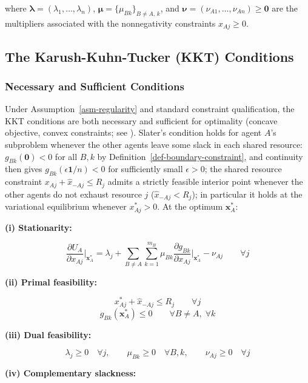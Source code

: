 \documentclass[11pt]{article}
\theoremstyle{plain}
\theoremstyle{definition}
\theoremstyle{remark}
\let\origsubsection\subsection
\renewcommand{\subsection}{\needspace{7\baselineskip}\origsubsection}
\let\origsubsubsection\subsubsection
\renewcommand{\subsubsection}{\needspace{4\baselineskip}\origsubsubsection}
\begin{document}
where \(\boldsymbol{\lambda} = (\lambda_1, \ldots, \lambda_n)\),
\(\boldsymbol{\mu} = \{\mu_{Bk}\}_{B \neq A, \, k}\), and
\(\boldsymbol{\nu} = (\nu_{A1}, \ldots, \nu_{An}) \geq \mathbf{0}\) are
the multipliers associated with the nonnegativity constraints
\(x_{Aj} \geq 0\).

\subsection{The Karush-Kuhn-Tucker (KKT)
Conditions}\label{the-karush-kuhn-tucker-kkt-conditions}

\subsubsection{Necessary and Sufficient
Conditions}\label{necessary-and-sufficient-conditions}

Under Assumption~\ref{asm-regularity} and standard constraint
qualification, the KKT conditions are both necessary and sufficient for
optimality (concave objective, convex constraints; see
\citep[§5.5.3]{Boyd2004}). Slater's condition holds for agent \(A\)'s
subproblem whenever the other agents leave some slack in each shared
resource: \(g_{Bk}(\mathbf{0}) < 0\) for all \(B, k\) by
Definition~\ref{def-boundary-constraint}, and continuity then gives
\(g_{Bk}(\epsilon\mathbf{1}/n) < 0\) for sufficiently small
\(\epsilon > 0\); the shared resource constraint
\(x_{Aj} + \hat{x}_{-Aj} \leq R_j\) admits a strictly feasible interior
point whenever the other agents do not exhaust resource \(j\)
(\(\hat{x}_{-Aj} < R_j\)); in particular it holds at the variational
equilibrium whenever \(x_{Aj}^* > 0\). At the optimum
\(\mathbf{x}_A^*\):

\textbf{(i) Stationarity:}

\[\frac{\partial U_A}{\partial x_{Aj}}\bigg|_{\mathbf{x}_A^*} = \lambda_j + \sum_{B \neq A} \sum_{k=1}^{m_B} \mu_{Bk} \frac{\partial g_{Bk}}{\partial x_{Aj}}\bigg|_{\mathbf{x}_A^*} - \nu_{Aj} \qquad \forall j\]

\textbf{(ii) Primal feasibility:}

\[x_{Aj}^* + \hat{x}_{-Aj} \leq R_j \qquad \forall j\]
\[g_{Bk}(\mathbf{x}_A^*) \leq 0 \qquad \forall B \neq A, \; \forall k\]

\textbf{(iii) Dual feasibility:}

\[\lambda_j \geq 0 \quad \forall j, \qquad \mu_{Bk} \geq 0 \quad \forall B, k, \qquad \nu_{Aj} \geq 0 \quad \forall j\]

\textbf{(iv) Complementary slackness:}
\end{document}
